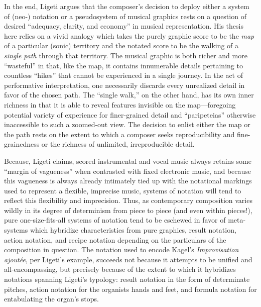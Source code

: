 In the end, Ligeti argues that the composer's decision to deploy either a system of (neo-) notation or a pseudosystem of musical graphics rests on a question of desired ``adequacy, clarity, and economy'' in musical representation. His thesis here relies on a vivid analogy which takes the purely graphic score to be the \textit{map} of a particular (sonic) territory and the notated score to be the walking of a \textit{single path} through that territory. The musical graphic is both richer and more ``wasteful'' in that, like the map, it contains innumerable details pertaining to countless ``hikes'' that cannot be experienced in a single journey. In the act of performative interpretation, one necessarily discards every unrealized detail in favor of the chosen path. The ``single walk,'' on the other hand, has its own inner richness in that it is able to reveal features invisible on the map---foregoing potential variety of experience for finer-grained detail and ``paripeteias'' otherwise inaccessible to such a zoomed-out view. The decision to enlist either the map or the path rests on the extent to which a composer seeks reproducibility and fine-grainedness or the richness of unlimited, irreproducible detail.\autocite[pg. 178 in Ernst et al., 1965.]{Ligeti_forthcoming}

Because, Ligeti  claims, scored instrumental and vocal music always retains some ``margin of vagueness'' when contrasted with fixed electronic music, and because this vagueness is always already intimately tied up with the notational markings used to represent a flexible, imprecise music, systems of notation will tend to reflect this flexibility and imprecision. Thus, as contemporary composition varies wildly in its degree of determinism from piece to piece (and even within pieces!), pure one-size-fits-all systems of notation tend to be eschewed in favor of meta-systems which hybridize characteristics from pure graphics, result notation, action notation, and recipe notation depending on the particulars of the composition in question. The notation used to encode Kagel's \textit{Improvisation ajoutée}, per Ligeti's example, succeeds not because it attempts to be unified and all-encompassing, but precisely because of the extent to which it hybridizes notations spanning Ligeti's typology: result notation in the form of determinate pitches, action notation for the organists hands and feet, and formula notation for entabulating the organ's stops.\autocite[pg. 180 in Ernst et al., 1965.]{Ligeti_forthcoming}


